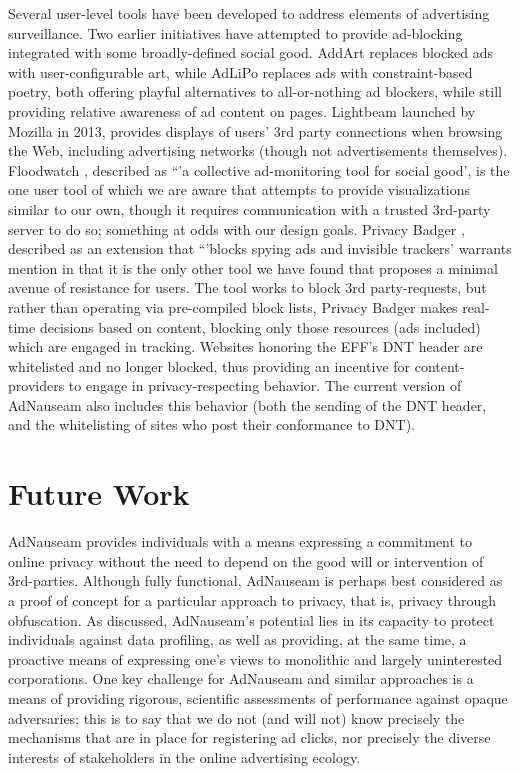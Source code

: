 \documentclass[conference]{IEEEtran}
\begin{document}
Several user-level tools have been developed to address elements of advertising surveillance. Two earlier initiatives have attempted to provide ad-blocking integrated with some broadly-defined social good. AddArt \cite{AddArt} replaces blocked ads with user-configurable art, while AdLiPo \cite{Howe-0} replaces ads with constraint-based poetry, both offering playful alternatives to all-or-nothing ad blockers, while still providing relative awareness of ad content on pages. Lightbeam \cite{Mozilla} launched by Mozilla in 2013, provides displays of users' 3rd party connections when browsing the Web, including advertising networks (though not advertisements themselves). Floodwatch \cite{Floodwatch}, described as “'a collective ad-monitoring tool for social good', is the one user tool of which we are aware that attempts to provide visualizations similar to our own, though it requires communication with a trusted 3rd-party server to do so; something at odds with our design goals. Privacy Badger \cite{EFF}, described as an extension that “'blocks spying ads and invisible trackers' warrants mention in that it is the only other tool we have found that proposes a minimal avenue of resistance for users. The tool works to block 3rd party-requests, but rather than operating via pre-compiled block lists, Privacy Badger makes real-time decisions based on content, blocking only those resources (ads included) which are engaged in tracking. Websites honoring the EFF's DNT header are whitelisted and no longer blocked, thus providing an incentive for content-providers to engage in privacy-respecting behavior. The current version of AdNauseam also includes this behavior (both the sending of the DNT header, and the whitelisting of sites who post their conformance to DNT).


\section{Future Work}

AdNauseam provides individuals with a means expressing a commitment to online privacy without the need to depend on the good will or intervention of 3rd-parties. Although fully functional, AdNauseam is perhaps best considered as a proof of concept for a particular approach to privacy, that is, privacy through obfuscation. As discussed, AdNauseam's potential lies in its capacity to protect individuals against data profiling, as well as providing, at the same time, a proactive means of expressing one's views to monolithic and largely uninterested corporations.
One key challenge for AdNauseam and similar approaches is a means of providing rigorous, scientific assessments of performance against opaque adversaries; this is to say that we do not (and will not) know precisely the mechanisms that are in place for registering ad clicks, nor precisely the diverse interests of stakeholders in the online advertising ecology.
\end{document}
